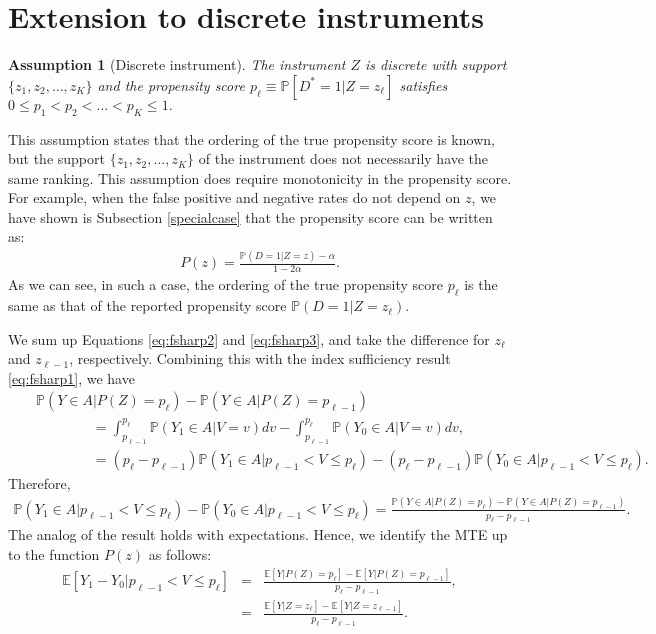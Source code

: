\documentclass[11pt,reqno]{amsart}
\theoremstyle{plain}
\newtheorem{assumption}{Assumption}
\numberwithin{equation}{section}
\begin{document}
\section{Extension to discrete instruments}\label{ext:discrete}
\begin{assumption}[Discrete instrument]\label{Discrete}
The instrument $Z$ is discrete with support $\{z_1, z_2, \ldots, z_K\}$ and the propensity score $p_\ell \equiv \mathbb P\left[D^*=1 \vert Z=z_\ell\right]$ satisfies $0 \leq p_{1} < p_{2} < \ldots < p_{K} \leq1.$
\end{assumption}
This assumption states that the ordering of the true propensity score is known, but the support $\{z_1, z_2, \ldots, z_K\}$ of the instrument does not necessarily have the same ranking. This assumption does require monotonicity in the propensity score. %
For example, when the false positive and negative rates do not depend on $z$, we have shown is Subsection \ref{specialcase} that the propensity score can be written as:
\begin{eqnarray*}
P(z)= \frac{\mathbb P(D=1\vert Z=z)-\alpha}{1-2\alpha}.
\end{eqnarray*}
As we can see, in such a case, the ordering of the true propensity score $p_\ell$ is the same as that of the reported propensity score $\mathbb P(D=1\vert Z=z_\ell)$. 
	
We sum up Equations \eqref{eq:fsharp2} and \eqref{eq:fsharp3}, and take the difference for $z_{\ell}$ and $z_{\ell-1}$, respectively. Combining this with the index sufficiency result \eqref{eq:fsharp1}, we have
\begin{eqnarray*}
&&\mathbb P(Y\in A\vert P(Z)=p_{\ell}) - \mathbb P(Y\in A \vert P(Z)=p_{\ell-1})\\
&&\qquad \qquad= \int^{p_{\ell}}_{p_{\ell-1}}\mathbb P\left(Y_1\in A \vert V=v\right)dv - \int_{p_{\ell-1}}^{p_{\ell}}\mathbb P\left(Y_0\in A \vert V=v\right)dv,\\
&& \qquad \qquad= (p_{\ell}-p_{\ell-1})\mathbb P\left(Y_1\in A \vert p_{\ell-1}<V\leq p_{\ell}\right) - (p_{\ell}-p_{\ell-1})\mathbb P\left(Y_0\in A \vert p_{\ell-1}<V\leq p_{\ell}\right)\nonumber.
\end{eqnarray*}
Therefore,
\begin{eqnarray*}
\mathbb P\left(Y_1\in A \vert p_{\ell-1}<V\leq p_{\ell}\right) - \mathbb P\left(Y_0\in A \vert p_{\ell-1}<V\leq p_{\ell}\right)= \frac{\mathbb P(Y\in A\vert P(Z)=p_{\ell}) - \mathbb P(Y\in A \vert P(Z)=p_{\ell-1})}{p_{\ell}-p_{\ell-1}}.
\end{eqnarray*}
The analog of the result holds with expectations. Hence, we identify the MTE up to the function $P(z)$ as follows:
\begin{eqnarray*}
\mathbb E\left[Y_1-Y_0 \vert p_{\ell-1}<V\leq p_{\ell}\right]&=& \frac{\mathbb E[Y\vert P(Z)=p_{\ell}] - \mathbb E[Y \vert P(Z)=p_{\ell-1}]}{p_{\ell}-p_{\ell-1}},\\
&=& \frac{\mathbb E[Y\vert Z=z_{\ell}] - \mathbb E[Y \vert Z=z_{\ell-1}]}{p_{\ell}-p_{\ell-1}}.
\end{eqnarray*}
\end{document}
